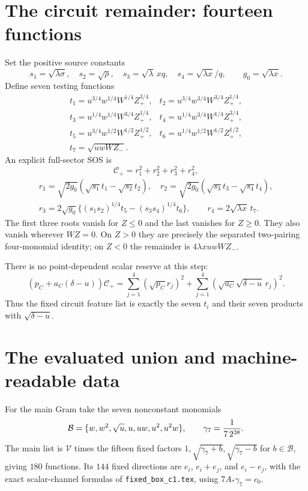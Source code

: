 \documentclass[11pt]{article}
\begin{document}
\section{The circuit remainder: fourteen functions}

Set the positive source constants
\[
 s_1=\sqrt{\lambda\sigma},\quad s_2=\sqrt\rho,\quad
 s_3=\sqrt\lambda\,xq,\quad s_4=\sqrt{\lambda x}/q,
 \qquad g_0=\sqrt{\lambda x}.
\]
Define seven testing functions
\[
\begin{array}{ll}
 t_1=u^{3/4}w^{1/4}W^{1/4}Z_+^{3/4},&
 t_2=u^{3/4}w^{3/4}W^{3/4}Z_+^{1/4},\\
 t_3=u^{1/4}w^{1/4}W^{3/4}Z_+^{1/4},&
 t_4=u^{1/4}w^{3/4}W^{1/4}Z_+^{3/4},\\
 t_5=u^{3/4}w^{1/2}W^{1/2}Z_+^{1/2},&
 t_6=u^{1/4}w^{1/2}W^{1/2}Z_+^{1/2},\\
 t_7=\sqrt{uwWZ_-}.&
\end{array}
\]
An explicit full-sector SOS is
\[
 \mathscr C_+=r_1^2+r_2^2+r_3^2+r_4^2,
\]
\[
\begin{gathered}
 r_1=\sqrt{2g_0}(\sqrt{s_1}t_1-\sqrt{s_2}t_2),\quad
 r_2=\sqrt{2g_0}(\sqrt{s_3}t_3-\sqrt{s_4}t_4),\\
 r_3=2\sqrt{g_0}\{(s_1s_2)^{1/4}t_5-(s_3s_4)^{1/4}t_6\},
 \qquad r_4=2\sqrt{\lambda x}\,t_7.
\end{gathered}
\]
The first three roots vanish for $Z\le0$ and the last vanishes
for $Z\ge0$. They also vanish wherever $WZ=0$. On $Z>0$ they
are precisely the separated two-pairing four-monomial identity;
on $Z<0$ the remainder is $4\lambda xuwWZ_-$.

There is no point-dependent scalar reserve at this step:
\[
 (p_C+a_C(\delta-u))\mathscr C_+
      =\sum_{j=1}^4(\sqrt{p_C}r_j)^2
        +\sum_{j=1}^4(\sqrt{a_C}\sqrt{\delta-u}\,r_j)^2.
\]
Thus the fixed circuit feature list is exactly the seven $t_i$
and their seven products with $\sqrt{\delta-u}$.

\section{The evaluated union and machine-readable data}

For the main Gram take the seven nonconstant monomials
\[
 \mathcal B=\{w,w^2,\sqrt u,u,uw,u^2,u^2w\},\qquad
 \gamma_7={1\over7\,2^{38}}.
\]
The main list is $\mathcal V$ times the fifteen fixed factors
$1,\sqrt{\gamma_7+b},\sqrt{\gamma_7-b}$ for $b\in\mathcal B$,
giving $180$ functions. Its $144$ fixed directions are $e_i$,
$e_i+e_j$, and $e_i-e_j$, with the exact scalar-channel formulas
of \texttt{fixed\_box\_c1.tex}, using $7A_*\gamma_7=c_0$.
\end{document}
